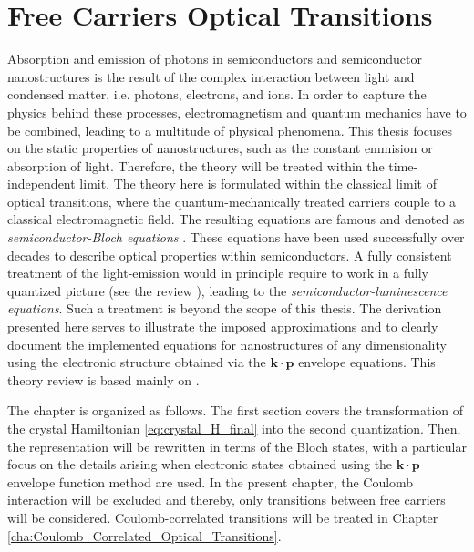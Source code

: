 %

\chapter{Free Carriers Optical Transitions}

\label{cha:Free_Carriers_Optical_Transitions}Absorption and emission
of photons in semiconductors and semiconductor nanostructures is the
result of the complex interaction between light and condensed matter,
i.e. photons, electrons, and ions. In order to capture the physics
behind these processes, electromagnetism and quantum mechanics have
to be combined, leading to a multitude of physical phenomena. This
thesis focuses on the static properties of nanostructures, such as
the constant emmision or absorption of light. Therefore, the theory
will be treated within the time-independent limit. The theory here
is formulated within the classical limit of optical transitions, where
the quantum-mechanically treated carriers couple to a classical electromagnetic
field. The resulting equations are famous and denoted as \emph{semiconductor-Bloch
equations} \citet{haug_quantum_1994}. These equations have been used
successfully over decades to describe optical properties within semiconductors.
A fully consistent treatment of the light-emission would in principle
require to work in a fully quantized picture (see the review \citet{Kira1999}),
leading to the \emph{semiconductor-luminescence equations}. Such a
treatment is beyond the scope of this thesis. The derivation presented
here serves to illustrate the imposed approximations and to clearly
document the implemented equations for nanostructures of any dimensionality
using the electronic structure obtained via the $\mathbf{k}\cdot\mathbf{p}$
envelope equations. This theory review is based mainly on \citet{Chuang1995,Jackson1998,Chow,Haug2009,Schafer2002}.

The chapter is organized as follows. The first section covers the
transformation of the crystal Hamiltonian \ref{eq:crystal_H_final}
into the second quantization. Then, the representation will be rewritten
in terms of the Bloch states, with a particular focus on the details
arising when electronic states obtained using the $\mathbf{k}\cdot\mathbf{p}$
envelope function method are used. In the present chapter, the Coulomb
interaction will be excluded and thereby, only transitions between
free carriers will be considered. Coulomb-correlated transitions will
be treated in Chapter \ref{cha:Coulomb_Correlated_Optical_Transitions}. 

